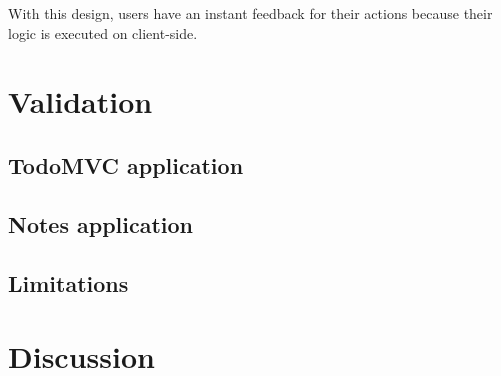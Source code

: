\documentclass{article}
\begin{document}
With this design, users have an instant feedback for their actions because their logic is executed on client-side.

\section{Validation}

\subsection{TodoMVC application}

\subsection{Notes application}

\subsection{Limitations}

\section{Discussion}



\end{document}
